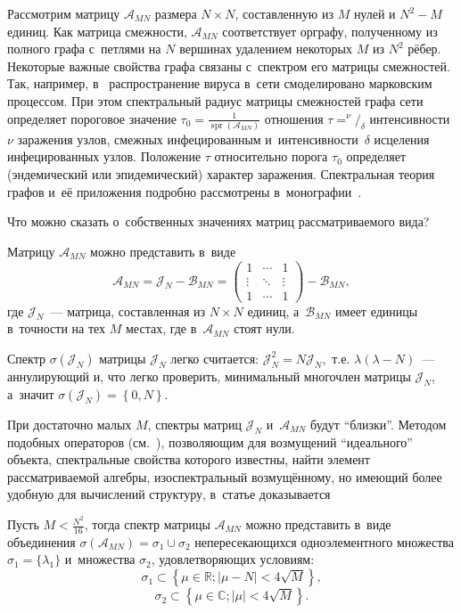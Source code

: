 Рассмотрим матрицу \( \mathscr{A}_{MN} \) размера \( N\times N \),
 составленную из \( M \) нулей и \( N^2 - M \) единиц.
Как матрица смежности, \( \mathscr{A}_{MN} \) соответствует орграфу,
 полученному из полного графа с~петлями на \( N \) вершинах
 удалением некоторых \( M \) из \( N^2 \) р\"ебер.
Некоторые важные свойства графа связаны с~спектром его матрицы смежностей.
Так, например, в~\cite{wang2003epidemic,chakrabarti2008epidemic}
 распространение вируса в~сети смоделировано марковским процессом.
 При этом спектральный радиус матрицы смежностей графа сети
 определяет пороговое значение
 \( \tau_0=\frac{1}{\operatorname{spr}(\mathscr{A}_{MN})} \)
 отношения \( \tau = ^\nu/_\delta \)
 интенсивности~\( \nu \) заражения узлов, смежных инфецированным
 и~интенсивности~\( \delta \) исцеления инфецированных узлов.
 Положение \(\tau\) относительно порога \({\tau_0}\) определяет
 (эндемический или эпидемический) характер заражения.
Спектральная теория графов и~е\"е приложения подробно рассмотрены
в~монографии~\cite{cvetkovic1980spectra}.

Что можно сказать о~собственных значениях матриц рассматриваемого вида?

Матрицу \( \mathscr{A}_{MN} \) можно представить в~виде
\[ \mathscr{A}_{MN} = \mathcal{J}_N - \mathscr{B}_{MN} =
    \begin{pmatrix}1 & \cdots & 1\\ \vdots & \ddots & \vdots \\ 1 & \cdots & 1\end{pmatrix} - \mathscr{B}_{MN}, \]
 где \( \mathcal{J}_N \)~--- матрица, составленная из \( N\times N \) единиц,
 а~\( \mathscr{B}_{MN} \) имеет единицы в~точности на тех \( M \) местах,
 где в~\( \mathscr{A}_{MN} \) стоят нули.

Спектр \( \sigma\left( \mathcal{J}_N \right) \)
 матрицы \( \mathcal{J}_N \) легко считается:
 \( \mathcal{J}_N^2 = N \mathcal{J}_N, \) т.е.
 \( \lambda(\lambda - N) \)~--- аннулирующий и, что легко проверить,
 минимальный многочлен матрицы \( \mathcal{J}_N \), а~значит
 \( \sigma\left( \mathcal{J}_N \right) = \left\{ 0,N \right\}. \)

При достаточно малых \( M \),
 спектры матриц \( \mathcal{J}_N \) и~\( \mathscr{A}_{MN} \) будут ``близки''.
Методом подобных операторов (см.~\cite{baskakov-harmonic,baskakov1983}),
 позволяющим для возмущений ``идеального'' объекта, спектральные свойства которого известны,
 найти элемент рассматриваемой алгебры, изоспектральный возмущ\"енному,
 но имеющий более удобную для вычислений структуру,
 в~статье доказывается
\begin{thm}\label{kozlukovsv:thm:almost-all-ones}
    Пусть \( M < \frac{N^2}{16} \),
    тогда спектр матрицы \( \mathscr{A}_{MN} \) можно представить в~виде
    объединения \( \sigma\left(\mathscr{A}_{MN}\right) = \sigma_1 \cup \sigma_2 \)
    непересекающихся
    одноэлементного множества \( \sigma_1=\{\lambda_1\} \)
    и~множества \( \sigma_2 \), удовлетворяющих условиям:
    \[ \sigma_1 \subset \left\{ \mu\in\mathbb{R}; \lvert \mu - N \rvert < 4\sqrt{M} \right\}, \]
    \[ \sigma_2 \subset \left\{ \mu\in\mathbb{C}; \lvert \mu \rvert < 4\sqrt{M} \right\}. \]
\end{thm}
